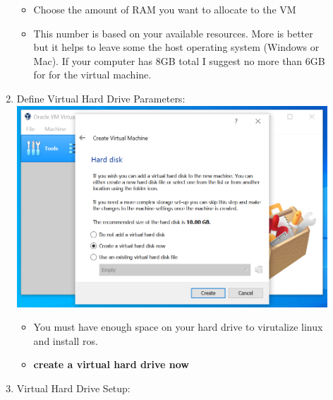 \documentclass[12pt]{article}
\begin{document}
\begin{description}
\begin{enumerate}
\begin{itemize}
                \item Choose the amount of RAM you want to allocate to the VM
                \item This number is based on your available resources. More is better but it helps to leave some the host operating system (Windows or Mac). If your computer has 8GB total I suggest no more than 6GB for for the virtual machine.  \vspace{5mm} \\
                
            \end{itemize}

\item Define Virtual Hard Drive Parameters: \vspace{5mm} \\
      		\hspace*{-2.5cm}\includegraphics[scale=.6]{Capture6.png}\\
 \begin{itemize}
                
                \item You must have enough space on your hard drive to virutalize linux and install ros. 
                \item {\bf create a virtual hard drive now}
                
            \end{itemize}
	\newpage
\item Virtual Hard Drive Setup: \vspace{5mm} \\


\end{enumerate}
\end{description}
\end{document}
